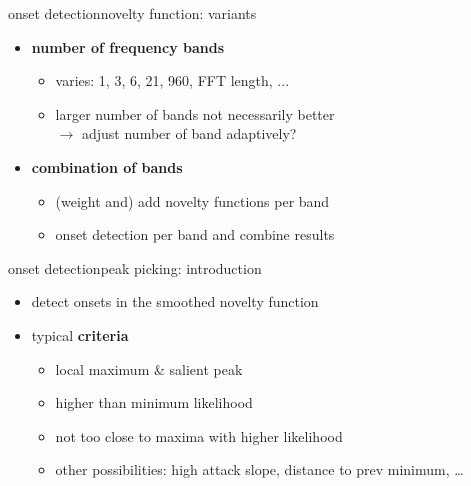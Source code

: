         \begin{frame}{onset detection}{novelty function: variants}
            \begin{itemize}
                \item	\textbf{number of frequency bands}
                    \begin{itemize}
                        \item	varies: 1, 3, 6, 21, 960, FFT length, ...
                        \item<2->	larger number of bands not necessarily better\\ $\rightarrow$ adjust number of band adaptively?
                    \end{itemize}
                \bigskip
                \item<3->	\textbf{combination of bands}
                    \begin{itemize}
                        \item	(weight and) add novelty functions per band
                        \item<4->	onset detection per band and combine results
                    \end{itemize}
            \end{itemize}
        \end{frame}
        \begin{frame}{onset detection}{peak picking: introduction}
            \vspace{-4mm}
            \begin{itemize}
                \item	detect onsets in the smoothed novelty function
                    \vspace{-5mm}
                
                \item<2->	typical \textbf{criteria}
                    \begin{itemize}
                        \item<2->	local maximum \& salient peak
                        \item<3->	higher than minimum likelihood
                        \item<4->	not too close to maxima with higher likelihood
                        \item<5->	other possibilities: high attack slope, distance to prev minimum, \ldots
                    \end{itemize}
            \end{itemize}
        \end{frame}
